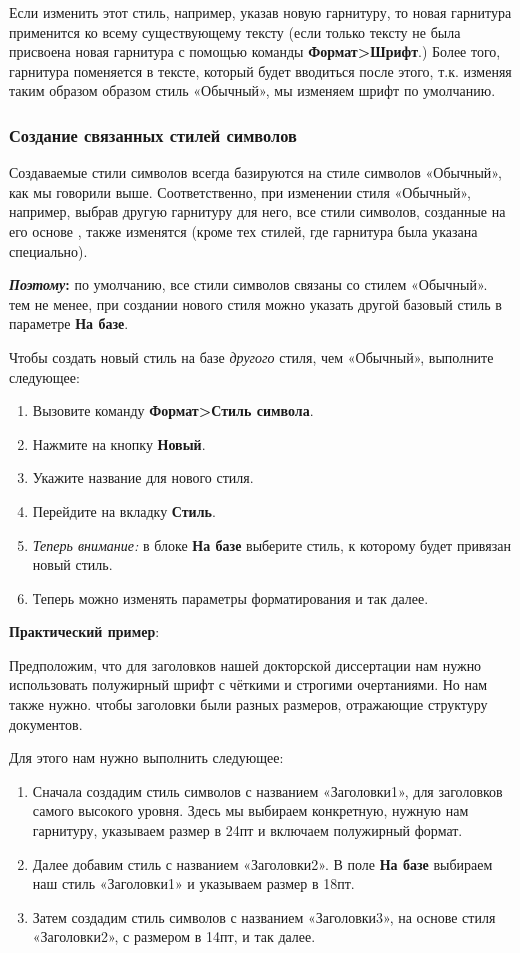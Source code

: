 ﻿\documentclass[a4paper,10pt]{article}
\begin{document}
Если изменить этот стиль, например, указав новую гарнитуру, то новая гарнитура применится ко всему существующему тексту (если только тексту не была присвоена новая гарнитура с помощью команды \textbf{Формат>Шрифт}.) Более того, гарнитура поменяется в тексте, который будет вводиться после этого, т.к.  изменяя таким образом образом стиль «Обычный», мы изменяем шрифт по умолчанию.

\subsubsection{Создание связанных стилей символов}
Создаваемые стили символов всегда базируются на стиле символов «Обычный», как мы говорили выше. Соответственно, при изменении стиля «Обычный», например, выбрав другую гарнитуру для него, все стили символов, созданные на его основе , также изменятся (кроме тех стилей, где гарнитура была указана специально).

\begin{mdframed}[backgroundcolor=blue!10]
\textbf{\textit{Поэтому}:} по умолчанию, все стили символов связаны со стилем «Обычный». тем не менее, при создании нового стиля можно указать другой базовый стиль в параметре \textbf{На базе}.
\end{mdframed}

Чтобы создать новый стиль на базе \textit{другого} стиля, чем «Обычный», выполните следующее:
\begin{enumerate}
 \item Вызовите команду \textbf{Формат>Стиль символа}.
 \item Нажмите на кнопку \textbf{Новый}.
 \item Укажите название для нового стиля.
\item Перейдите на вкладку \textbf{Стиль}.
\item \textit{Теперь внимание:} в блоке \textbf{На базе} выберите стиль, к которому будет привязан новый стиль.
\item Теперь можно изменять параметры форматирования и так далее.
\end{enumerate}

\textbf{Практический пример}:

Предположим, что для заголовков нашей докторской диссертации нам нужно использовать полужирный шрифт с чёткими и строгими очертаниями. Но нам также нужно. чтобы заголовки были разных размеров, отражающие структуру документов.

Для этого нам нужно выполнить следующее:
\begin{enumerate}
 \item Сначала создадим стиль символов с названием «Заголовки1», для заголовков самого высокого уровня. Здесь мы выбираем конкретную, нужную нам  гарнитуру, указываем размер в 24пт и включаем полужирный формат.
 \item Далее добавим стиль с названием «Заголовки2». В поле \textbf{На базе} выбираем наш стиль «Заголовки1» и указываем размер в 18пт.
 \item Затем создадим стиль символов с названием «Заголовки3», на основе стиля «Заголовки2», с размером в 14пт, и так далее.
\end{enumerate}
\end{document}
